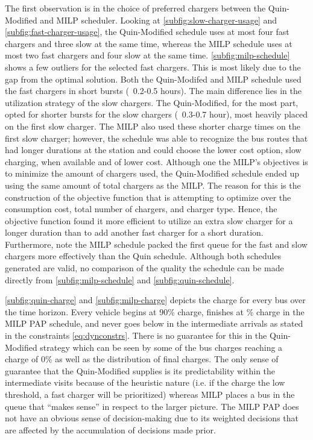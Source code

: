 The first observation is in the choice of preferred chargers between the Quin-Modified and MILP scheduler. Looking at
\autoref{subfig:slow-charger-usage} and \autoref{subfig:fast-charger-usage}, the Quin-Modified schedule uses at most
four fast chargers and three slow at the same time, whereas the MILP schedule uses at most two fast chargers and four
slow at the same time. \autoref{subfig:milp-schedule} shows a few outliers for the selected fast chargers. This is most
likely due to the gap from the optimal solution. Both the Quin-Modifed and MILP schedule used the fast chargers in short
bursts (~0.2-0.5 hours). The main difference lies in the utilization strategy of the slow chargers. The Quin-Modified,
for the most part, opted for shorter bursts for the slow chargers (~0.3-0.7 hour), most heavily placed on the first slow
charger. The MILP also used these shorter charge times on the first slow charger; however, the schedule was able to
recognize the bus routes that had longer durations at the station and could choose the lower cost option, slow charging,
when available and of lower cost. Although one the MILP's objectives is to minimize the amount of chargers used, the
Quin-Modified schedule ended up using the same amount of total chargers as the MILP. The reason for this is the
construction of the objective function that is attempting to optimize over the consumption cost, total number of
chargers, and charger type. Hence, the objective function found it more efficient to utilize an extra slow charger for a
longer duration than to add another fast charger for a short duration. Furthermore, note the MILP schedule packed the
first queue for the fast and slow chargers more effectively than the Quin schedule. Although both schedules generated
are valid, no comparison of the quality the schedule can be made directly from \autoref{subfig:milp-schedule} and
\autoref{subfig:quin-schedule}.


\autoref{subfig:quin-charge} and \autoref{subfig:milp-charge} depicts the charge for every bus over the time horizon.
Every vehicle begins at 90\% charge, finishes at \% charge in the MILP PAP schedule, and never
goes below \mincharge in the intermediate arrivals as stated in the constraints \autoref{eq:dynconstrs}. There is no
guarantee for this in the Quin-Modified strategy which can be seen by some of the bus charges reaching a charge of 0\%
as well as the distribution of final charges. The only sense of guarantee that the Quin-Modified supplies is its
predictability within the intermediate visits because of the heuristic nature (i.e. if the charge the low threshold, a
fast charger will be prioritized) whereas MILP places a bus in the queue that ``makes sense'' in respect to the larger
picture. The MILP PAP does not have an obvious sense of decision-making due to its weighted decisions that are affected
by the accumulation of decisions made prior.

